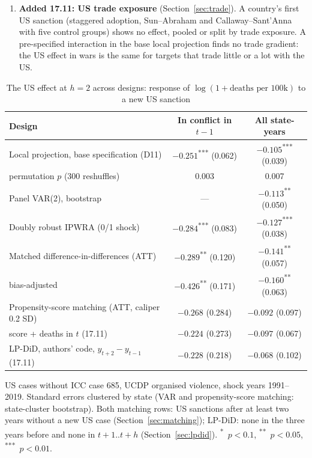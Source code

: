 \documentclass[11pt,a4paper]{article}
\newcommand{\sig}[1]{\textsuperscript{#1}}
\begin{document}
\begin{mdframed}[linewidth=0.6pt,innerleftmargin=10pt,innerrightmargin=10pt]
\begin{enumerate}[leftmargin=*]
  had escalated 3--5 years before the sanction. In the local projection Western rich and UN sanctions are also followed by
  fewer deaths (UN: slower but cumulating), but only the US effect is supported by matching. Overall assessment: Section~\ref{sec:final}.
\item \textbf{Added 17.11: US trade exposure} (Section~\ref{sec:trade}). A country's first US sanction (staggered
  adoption, Sun--Abraham and Callaway--Sant'Anna with five control groups) shows no effect, pooled or split by trade
  exposure. A pre-specified interaction in the base local projection finds no trade gradient: the US effect in wars is
  the same for targets that trade little or a lot with the US.
\end{enumerate}
\end{mdframed}

\begin{table}[H]
\centering\small
\caption{The US effect at $h=2$ across designs: response of $\log(1+\text{deaths per 100k})$ to a new US sanction}
\label{tab:headline}
\begin{threeparttable}
\begin{tabular}{@{}lcc@{}}
\toprule
Design & In conflict in $t-1$ & All state-years \\
\midrule
Local projection, base specification (D11) & $-0.251$\sig{***} (0.062) & $-0.105$\sig{***} (0.039) \\
\quad permutation $p$ (300 reshuffles) & 0.003 & 0.007 \\
Panel VAR(2), bootstrap & --- & $-0.113$\sig{**} (0.050) \\
Doubly robust IPWRA (0/1 shock) & $-0.284$\sig{***} (0.083) & $-0.127$\sig{***} (0.038) \\
Matched difference-in-differences (ATT) & $-0.289$\sig{**} (0.120) & $-0.141$\sig{**} (0.057) \\
\quad bias-adjusted & $-0.426$\sig{**} (0.171) & $-0.160$\sig{**} (0.063) \\
Propensity-score matching (ATT, caliper 0.2 SD) & $-0.268$ (0.284) & $-0.092$ (0.097) \\
\quad score + deaths in $t$ (17.11) & $-0.224$ (0.273) & $-0.097$ (0.067) \\
LP-DiD, authors' code, $y_{t+2}-y_{t-1}$ (17.11) & $-0.228$ (0.218) & $-0.068$ (0.102) \\
\bottomrule
\end{tabular}
\begin{tablenotes}\footnotesize
\item US cases without ICC case 685, UCDP organised violence, shock years 1991--2019. Standard errors clustered by
state (VAR and propensity-score matching: state-cluster bootstrap). Both matching rows: US sanctions after at least two
years without a new US case (Section~\ref{sec:matching}); LP-DiD: none in the three years before and none in
$t+1..t+h$ (Section~\ref{sec:lpdid}). \sig{*}~$p<0.1$, \sig{**}~$p<0.05$, \sig{***}~$p<0.01$.
\end{tablenotes}
\end{threeparttable}
\end{table}
\end{document}
